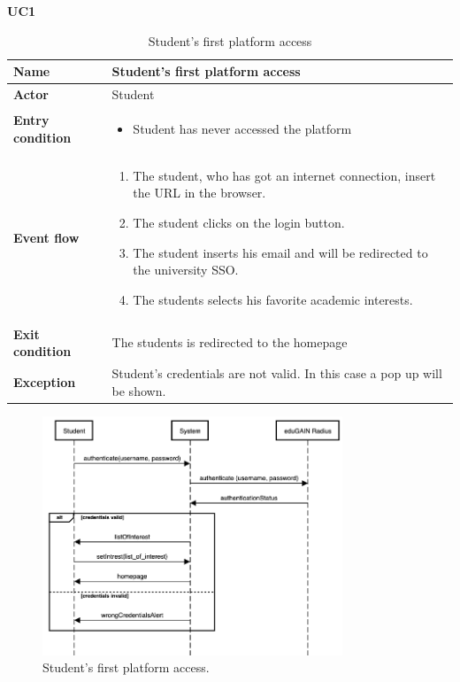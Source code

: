     \textbf{UC1}
    \begin{table}[H]
    \centering
    \begin{tabular}{|l|p{11.9cm}|}
        \hline
        \textbf{Name}            & Student's first platform access                     \\\hline
        \textbf{Actor}           & Student         \\\hline
        \textbf{Entry condition} &
        \begin{itemize}
              \item Student has never accessed the platform
        \end{itemize}                                        \\\hline
        \textbf{Event flow}      &
        \begin{enumerate}[label=\arabic*.]
              \item The student, who has got an internet connection, insert the URL in the browser.
              \item The student clicks on the login button.
              \item The student inserts his email and will be redirected to the university SSO.
              \item The students selects his favorite academic interests.
        \end{enumerate}            \\\hline
        \textbf{Exit condition}  & The students is redirected to the homepage\\\hline
        \textbf{Exception}       &  Student's credentials are not valid. In this case a pop up will be shown.   \\\hline
    \end{tabular}
    \caption{Student's first platform access}
    \label{table:Student's first platform access}
    \end{table}

    \begin{figure}[H]
        \centering
        \includegraphics[width=0.8\textwidth]{Assets/SequenceDiagrams/1-login.png}
        \caption{Student's first platform access.}
        \label{fig:Student's first platform access}
    \end{figure}


